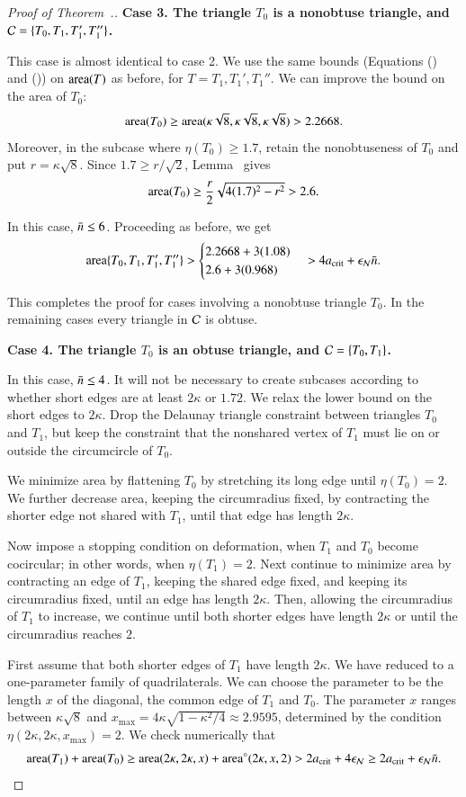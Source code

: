 \begin{proof}[Proof of Theorem~.]
{\bf Case 3. The triangle $T_0$ is a nonobtuse triangle, and
  $\mathcal C=\{T_0,T_1,T_1',T_1''\}$.}

This case is almost identical to case 2.  We use the same bounds
(Equations () and ()) on ${\operatorname{area}}(T)$ as
before, for $T = T_1, T_1', T_1''$.  We can improve the bound on the
area of $T_0$:
\[
{\operatorname{area}}(T_0) 
\ge {\operatorname{area}}(\kappa\sqrt{8},\kappa\sqrt{8},\kappa\sqrt{8}) > 2.2668.
\]
Moreover, in the subcase where $\eta(T_0)\ge1.7$, retain the
nonobtuseness of $T_0$ and put $r=\kappa\sqrt8$.
Since $1.7\ge r/\sqrt2$, Lemma~
gives
\[
{\operatorname{area}}(T_0)\ge\frac r2\sqrt{4(1.7)^2-r^2}>2.6.
\]

In this case, $\bar n\le 6$.  Proceeding as before, we get
\[
{\operatorname{area}}\{T_0,T_1,T_1',T_1''\} > 
\begin{cases}
2.2668 + 3 (1.08) \\
2.6 + 3(0.968)
\end{cases}
> 4a_\text{crit} +  \epsilon_{\mathcal N} \bar n.
\] 

This completes the proof for cases involving a nonobtuse triangle
$T_0$. In the remaining cases every triangle in $\mathcal C$ is obtuse.

{\bf Case 4. The triangle $T_0$ is an obtuse triangle, and
  $\mathcal C=\{T_0,T_1\}$.}

In this case, $\bar n\le 4$.  It will not be necessary to create subcases
according to whether short edges are at least $2\kappa$ or $1.72$.  We
relax the lower bound on the short edges to
$2\kappa$. %
Drop the Delaunay triangle constraint between triangles $T_0$ and $T_1$,
but keep the constraint that the nonshared vertex of $T_1$ must lie on
or outside the circumcircle of $T_0$. 

We minimize area by flattening $T_0$ by stretching its long edge until
$\eta(T_0)=2$.  We further decrease area, keeping the circumradius
fixed, by contracting the shorter edge not shared with $T_1$, until
that edge has length $2\kappa$.

Now impose a stopping condition on deformation, when $T_1$ and $T_0$ become
cocircular; in other words, when $\eta(T_1)=2$.
Next continue to minimize area by contracting an edge of $T_1$, keeping
the shared edge fixed, and
keeping its circumradius fixed, until an edge has length $2\kappa$.
Then, allowing the circumradius of $T_1$ to increase, we continue until
both shorter edges have length $2\kappa$ or until the circumradius
reaches $2$.

First assume that both shorter edges of $T_1$ have length $2\kappa$.
We have reduced to a one-parameter family of quadrilaterals.  We can
choose the parameter to be the length $x$ of the diagonal, the common
edge of $T_1$ and $T_0$.  The parameter $x$ ranges between
$\kappa\sqrt{8}$ and $x_{\max}=4\kappa\sqrt{1-\kappa^2/4}\approx 2.9595$, determined by the
condition $\eta(2\kappa,2\kappa,x_{\max}) = 2$.  We check numerically
that
\[
{\operatorname{area}}(T_1) + {\operatorname{area}}(T_0) \ge {\operatorname{area}}(2\kappa,2\kappa,x) +
{\operatorname{area}}^\circ(2\kappa,x,2) > 2a_\text{crit} + 4 \epsilon_{\mathcal N} \ge 2a_\text{crit} + \epsilon_{\mathcal N} \bar n.
\] 


\end{proof}
